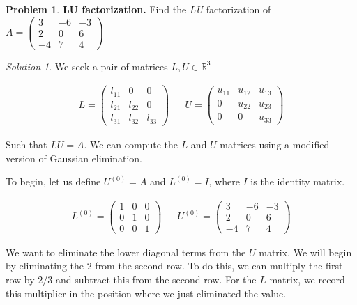 \documentclass[12pt,a4paper]{article}
\theoremstyle{definition}
\newtheorem{problem}{Problem}
\theoremstyle{remark}
\newtheorem*{solution}{Solution}
\begin{document}
\begin{problem}
    \textbf{LU factorization.} Find the \textit{LU} factorization of $A = \begin{pmatrix}
        3 & -6 & -3 \\
        2 & 0 & 6 \\
        -4 & 7 & 4
    \end{pmatrix}$
\end{problem}
\begin{solution}
    We seek a pair of matrices $L, U \in \mathbb R^3$ 

    \begin{align*}
        L = \begin{pmatrix}
            l_{11} & 0 & 0 \\
            l_{21} & l_{22} & 0 \\
            l_{31} & l_{32} & l_{33}
        \end{pmatrix} &&
        U = \begin{pmatrix}
            u_{11} & u_{12} & u_{13}\\
            0 & u_{22} & u_{23}\\
            0 & 0 & u_{33}
        \end{pmatrix}
    \end{align*}

    Such that $LU = A$. We can compute the $L$ and $U$ matrices using a modified version of Gaussian elimination. 

    To begin, let us define $U^{(0)} = A$ and $L^{(0)} = I$, where $I$ is the identity matrix. 

    \begin{align*}
        L^{(0)} = \begin{pmatrix}
            1 & 0 & 0 \\
            0 & 1 & 0 \\
            0 & 0 & 1
        \end{pmatrix} &&
        U^{(0)} = \begin{pmatrix}
            3 & -6 & -3 \\
            2 & 0 & 6 \\
            -4 & 7 & 4
        \end{pmatrix}
    \end{align*}

    We want to eliminate the lower diagonal terms from the $U$ matrix. We will begin by eliminating the $2$ from the second row. To do this, we can multiply the first row by $2/3$ and subtract this from the second row. For the $L$ matrix, we record this multiplier in the position where we just eliminated the value. 


\end{solution}
\end{document}
